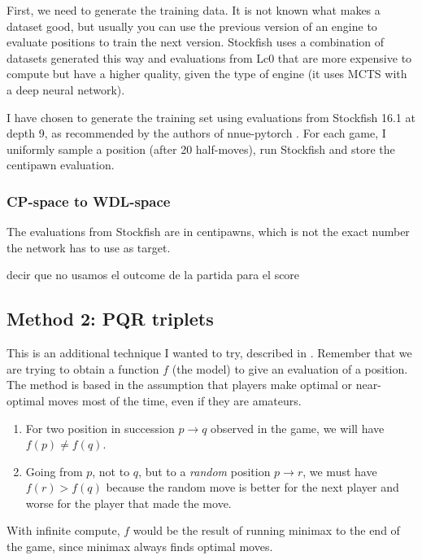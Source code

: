 First, we need to generate the training data. It is not known what makes a dataset good, but usually you can use the previous version of an engine to evaluate positions to train the next version. Stockfish uses a combination of datasets generated this way and evaluations from Lc0 that are more expensive to compute but have a higher quality, given the type of engine (it uses MCTS with a deep neural network).

I have chosen to generate the training set using evaluations from Stockfish 16.1 at depth 9, as recommended by the authors of nnue-pytorch \cite{nnue-pytorch}. For each game, I uniformly sample a position (after 20 half-moves), run Stockfish and store the centipawn evaluation.

\setcounter{secnumdepth}{4}
\subsubsection{CP-space to WDL-space}

The evaluations from Stockfish are in centipawns, which is not the exact number the network has to use as target.


decir que no usamos el outcome de la partida para el score


\subsection{Method 2: PQR triplets}

This is an additional technique I wanted to try, described in \cite{dlchess:2014}. Remember that we are trying to obtain a function $f$ (the model) to give an evaluation of a position. The method is based in the assumption that players make optimal or near-optimal moves most of the time, even if they are amateurs.

\begin{enumerate}
\item For two position in succession $p \rightarrow q$  observed in the game, we will have $f(p) \neq f(q)$.
\item Going from $p$, not to $q$, but to a \textit{random} position $p \rightarrow r$, we must have $f(r) > f(q)$ because the random move is better for the next player and worse for the player that made the move.
\end{enumerate}

With infinite compute, $f$ would be the result of running minimax to the end of the game, since minimax always finds optimal moves.

